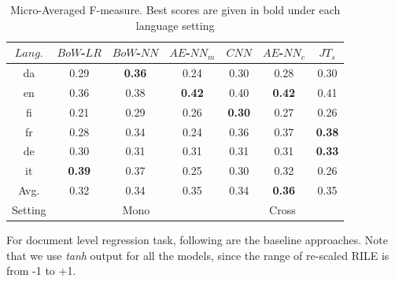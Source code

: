 \documentclass[11pt,a4paper]{article}
\begin{document}
 \begin{table}[!htp]
  \centering
  \begin{tabular}{ c | c c c | c c c}
  \toprule
    $Lang.$ & $BoW$-$LR$ & $BoW$-$NN$ & $AE$-$NN_{m}$ & $CNN$ & $AE$-$NN_{c}$ & $JT_{s}$\\
    \midrule
    da  & 	0.29 & \textbf{0.36} & 0.24 & 0.30 & 0.28 & 0.30\\
    en   &  0.36 & 0.38 & \textbf{0.42} & 0.40 & \textbf{0.42} & 0.41\\    	
    fi  &   0.21 & 0.29 & 0.26 & \textbf{0.30} & 0.27 & 0.26\\
    fr    & 0.28 & 0.34 & 0.24 & 0.36 & 0.37 & \textbf{0.38} \\
    de    &  0.30 & 0.31 & 0.31 & 0.31 & 0.31 & \textbf{0.33}\\
    it    & \textbf{0.39} & 0.37 & 0.25 & 0.30 & 0.32 & 0.26\\
\midrule
Avg.    & 0.32 & 0.34 & 0.35 & 0.34 & \textbf{0.36} & 0.35\\
\midrule
Setting &  \multicolumn{3}{c|}{Mono} & \multicolumn{3}{c}{Cross} \\
 \bottomrule

  \end{tabular}
  \caption{Micro-Averaged F-measure. Best scores are given in bold under each language setting}
  \label{tab:al}
\end{table}

For document level regression task, following are the baseline approaches. Note that we use \textit{tanh} output for all the models, since the range of re-scaled RILE is from -1 to +1.
\end{document}

